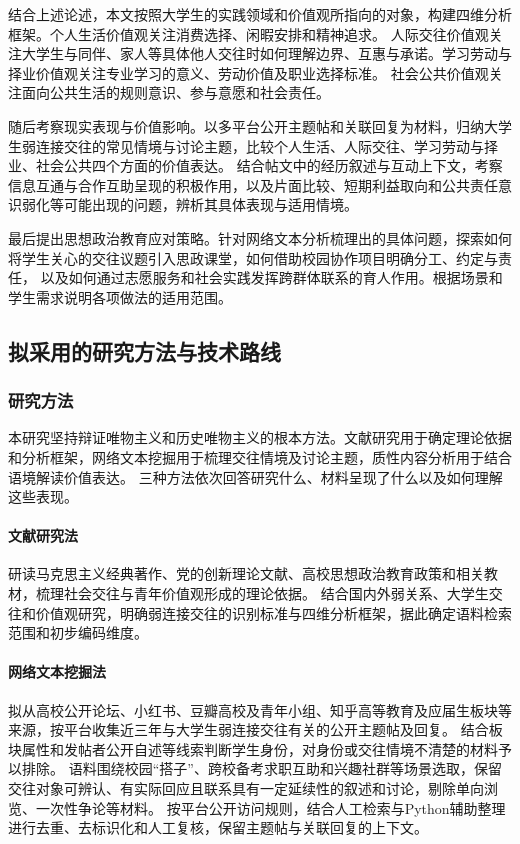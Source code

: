 结合上述论述，本文按照大学生的实践领域和价值观所指向的对象，构建四维分析框架。个人生活价值观关注消费选择、闲暇安排和精神追求。
人际交往价值观关注大学生与同伴、家人等具体他人交往时如何理解边界、互惠与承诺。学习劳动与择业价值观关注专业学习的意义、劳动价值及职业选择标准。
社会公共价值观关注面向公共生活的规则意识、参与意愿和社会责任。

随后考察现实表现与价值影响。以多平台公开主题帖和关联回复为材料，归纳大学生弱连接交往的常见情境与讨论主题，比较个人生活、人际交往、学习劳动与择业、社会公共四个方面的价值表达。
结合帖文中的经历叙述与互动上下文，考察信息互通与合作互助呈现的积极作用，以及片面比较、短期利益取向和公共责任意识弱化等可能出现的问题，辨析其具体表现与适用情境。

最后提出思想政治教育应对策略。针对网络文本分析梳理出的具体问题，探索如何将学生关心的交往议题引入思政课堂，如何借助校园协作项目明确分工、约定与责任，
以及如何通过志愿服务和社会实践发挥跨群体联系的育人作用。根据场景和学生需求说明各项做法的适用范围。

\subsection{拟采用的研究方法与技术路线}

\subsubsection{研究方法}

本研究坚持辩证唯物主义和历史唯物主义的根本方法。文献研究用于确定理论依据和分析框架，网络文本挖掘用于梳理交往情境及讨论主题，质性内容分析用于结合语境解读价值表达。
三种方法依次回答研究什么、材料呈现了什么以及如何理解这些表现。

\paragraph{文献研究法}
研读马克思主义经典著作、党的创新理论文献、高校思想政治教育政策和相关教材，梳理社会交往与青年价值观形成的理论依据。
结合国内外弱关系、大学生交往和价值观研究，明确弱连接交往的识别标准与四维分析框架，据此确定语料检索范围和初步编码维度。

\paragraph{网络文本挖掘法}
拟从高校公开论坛、小红书、豆瓣高校及青年小组、知乎高等教育及应届生板块等来源，按平台收集近三年与大学生弱连接交往有关的公开主题帖及回复。
结合板块属性和发帖者公开自述等线索判断学生身份，对身份或交往情境不清楚的材料予以排除。
语料围绕校园“搭子”、跨校备考求职互助和兴趣社群等场景选取，保留交往对象可辨认、有实际回应且联系具有一定延续性的叙述和讨论，剔除单向浏览、一次性争论等材料。
按平台公开访问规则，结合人工检索与Python辅助整理进行去重、去标识化和人工复核，保留主题帖与关联回复的上下文。

